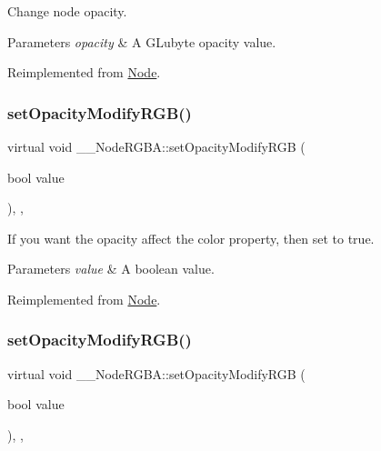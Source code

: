 Change node opacity. 
\begin{DoxyParams}{Parameters}
{\em opacity} & A G\+Lubyte opacity value. \\
\hline
\end{DoxyParams}


Reimplemented from \hyperlink{classNode_ae41a9db63bfa3d466ee7c9d79c35352d}{Node}.

\mbox{\label{class____NodeRGBA_a2baa7449894e58c0bc78e749058b9c0e}} 
\subsubsection{\texorpdfstring{set\+Opacity\+Modify\+R\+G\+B()}{setOpacityModifyRGB()}\hspace{0.1cm}{\footnotesize\ttfamily [1/2]}}
{\footnotesize\ttfamily virtual void \+\_\+\+\_\+\+Node\+R\+G\+B\+A\+::set\+Opacity\+Modify\+R\+GB (\begin{DoxyParamCaption}\item[{bool}]{value }\end{DoxyParamCaption})\hspace{0.3cm}{\ttfamily [inline]}, {\ttfamily [override]}, {\ttfamily [virtual]}}

If you want the opacity affect the color property, then set to true. 
\begin{DoxyParams}{Parameters}
{\em value} & A boolean value. \\
\hline
\end{DoxyParams}


Reimplemented from \hyperlink{classNode_a978c5435ab23f76e9efdf0f7e9e288e5}{Node}.

\mbox{\label{class____NodeRGBA_a2baa7449894e58c0bc78e749058b9c0e}} 
\subsubsection{\texorpdfstring{set\+Opacity\+Modify\+R\+G\+B()}{setOpacityModifyRGB()}\hspace{0.1cm}{\footnotesize\ttfamily [2/2]}}
{\footnotesize\ttfamily virtual void \+\_\+\+\_\+\+Node\+R\+G\+B\+A\+::set\+Opacity\+Modify\+R\+GB (\begin{DoxyParamCaption}\item[{bool}]{value }\end{DoxyParamCaption})\hspace{0.3cm}{\ttfamily [inline]}, {\ttfamily [override]}, {\ttfamily [virtual]}}

